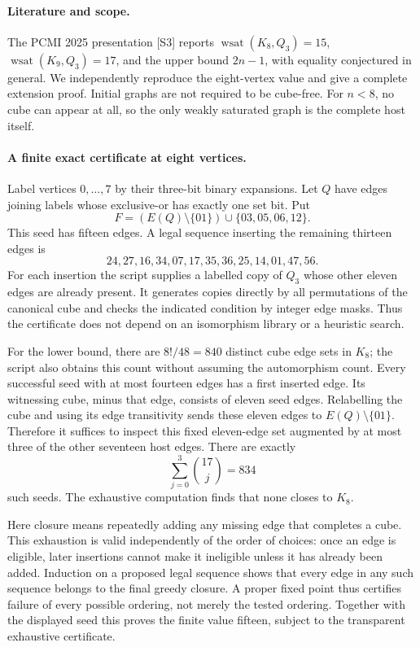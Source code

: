 \documentclass[11pt,a4paper]{article}
\begin{document}
\paragraph{Literature and scope.}
The PCMI 2025 presentation [S3] reports $\operatorname{wsat}(K_8,Q_3)=15$, $\operatorname{wsat}(K_9,Q_3)=17$, and the upper bound $2n-1$, with equality conjectured in general. We independently reproduce the eight-vertex value and give a complete extension proof. Initial graphs are not required to be cube-free. For $n<8$, no cube can appear at all, so the only weakly saturated graph is the complete host itself.

\paragraph{A finite exact certificate at eight vertices.}
Label vertices $0,\ldots,7$ by their three-bit binary expansions. Let $Q$ have edges joining labels whose exclusive-or has exactly one set bit. Put
\[
 F=(E(Q)\setminus\{01\})\cup\{03,05,06,12\}.
\]
This seed has fifteen edges. A legal sequence inserting the remaining thirteen edges is
\[
 24,27,16,34,07,17,35,36,25,14,01,47,56.
\]
For each insertion the script supplies a labelled copy of $Q_3$ whose other eleven edges are already present. It generates copies directly by all permutations of the canonical cube and checks the indicated condition by integer edge masks. Thus the certificate does not depend on an isomorphism library or a heuristic search.

For the lower bound, there are $8!/48=840$ distinct cube edge sets in $K_8$; the script also obtains this count without assuming the automorphism count. Every successful seed with at most fourteen edges has a first inserted edge. Its witnessing cube, minus that edge, consists of eleven seed edges. Relabelling the cube and using its edge transitivity sends these eleven edges to $E(Q)\setminus\{01\}$. Therefore it suffices to inspect this fixed eleven-edge set augmented by at most three of the other seventeen host edges. There are exactly
\[
 \sum_{j=0}^{3}\binom{17}{j}=834
\]
such seeds. The exhaustive computation finds that none closes to $K_8$.

Here closure means repeatedly adding any missing edge that completes a cube. This exhaustion is valid independently of the order of choices: once an edge is eligible, later insertions cannot make it ineligible unless it has already been added. Induction on a proposed legal sequence shows that every edge in any such sequence belongs to the final greedy closure. A proper fixed point thus certifies failure of every possible ordering, not merely the tested ordering. Together with the displayed seed this proves the finite value fifteen, subject to the transparent exhaustive certificate.
\end{document}
